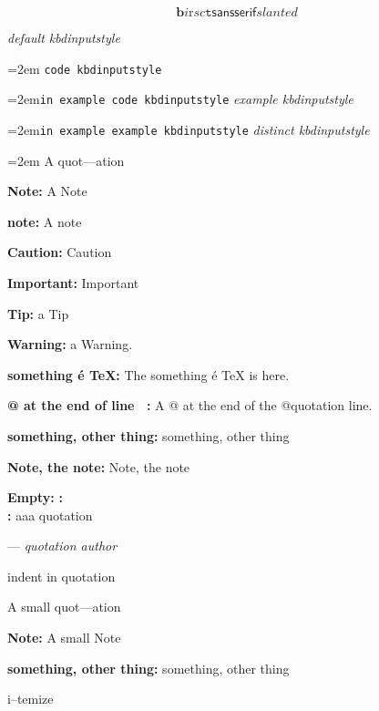 \documentclass{book}
\begin{document}
$$
\mathbf{b} \mathit{i} \mathrm{r} sc \mathtt{t} \mathsf{sansserif} slanted
$$

{\ttfamily\textsl{default kbdinputstyle}}
\par\begingroup\obeylines\obeyspaces\frenchspacing\leftskip=2em\relax\parskip=0pt\relax{}
\endgroup{}
\texttt{code kbdinputstyle}
\par\begingroup\obeylines\obeyspaces\frenchspacing\leftskip=2em\relax\parskip=0pt\relax\ttfamily{}\texttt{in example code kbdinputstyle}
\endgroup{}
{\ttfamily\textsl{example kbdinputstyle}}
\par\begingroup\obeylines\obeyspaces\frenchspacing\leftskip=2em\relax\parskip=0pt\relax\ttfamily{}\texttt{in example example kbdinputstyle}
\endgroup{}
{\ttfamily\textsl{distinct kbdinputstyle}}
\par\begingroup\obeylines\obeyspaces\frenchspacing\leftskip=2em\relax\parskip=0pt\relax{}
\endgroup{}
A quot---ation

\textbf{Note:} A Note

\textbf{note:} A note

\textbf{Caution:} Caution

\textbf{Important:} Important

\textbf{Tip:} a Tip

\textbf{Warning:} a Warning.

\textbf{something \'{e} \TeX{}:} The something \'{e} \TeX{} is here.

\textbf{@ at the end of line \ {}:} A @ at the end of the @quotation line.

\textbf{something, other thing:} something, other thing

\textbf{Note, the note:} Note, the note


\textbf{Empty:} 
\textbf{:} 
\textbf{\leavevmode{}\\:} 
aaa quotation
\begin{center}
--- \emph{quotation author}
\end{center}

indent in quotation

A small quot---ation

\textbf{Note:} A small Note

\textbf{something, other thing:} something, other thing

\textbullet{} 

i--temize
\end{document}
